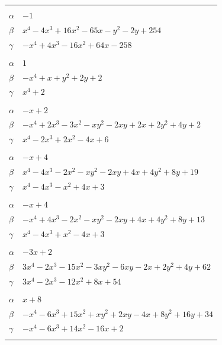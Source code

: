 \documentclass[11pt]{article}
\begin{document}
\begin{longtable}{@{}ll@{}}
\addlinespace[3pt]
\multicolumn{2}{@{}l}{$\{i,j\}=\{9,14\}$, $k_{ij}=2^{2}\cdot 3\cdot 5\cdot 17$}\\
$\alpha$ & $-1$\\
$\beta$ & $x^{4}-4x^{3}+16x^{2}-65x-y^{2}-2y+254$\\
$\gamma$ & $-x^{4}+4x^{3}-16x^{2}+64x-258$\\
\addlinespace[3pt]
\multicolumn{2}{@{}l}{$\{i,j\}=\{9,15\}$, $k_{ij}=2^{2}\cdot 3$}\\
$\alpha$ & $1$\\
$\beta$ & $-x^{4}+x+y^{2}+2y+2$\\
$\gamma$ & $x^{4}+2$\\
\addlinespace[3pt]
\multicolumn{2}{@{}l}{$\{i,j\}=\{9,17\}$, $k_{ij}=2^{2}\cdot 3$}\\
$\alpha$ & $-x+2$\\
$\beta$ & $-x^{4}+2x^{3}-3x^{2}-xy^{2}-2xy+2x+2y^{2}+4y+2$\\
$\gamma$ & $x^{4}-2x^{3}+2x^{2}-4x+6$\\
\addlinespace[3pt]
\multicolumn{2}{@{}l}{$\{i,j\}=\{9,19\}$, $k_{ij}=3\cdot 17$}\\
$\alpha$ & $-x+4$\\
$\beta$ & $x^{4}-4x^{3}-2x^{2}-xy^{2}-2xy+4x+4y^{2}+8y+19$\\
$\gamma$ & $x^{4}-4x^{3}-x^{2}+4x+3$\\
\addlinespace[3pt]
\multicolumn{2}{@{}l}{$\{i,j\}=\{9,24\}$, $k_{ij}=3^{2}\cdot 5$}\\
$\alpha$ & $-x+4$\\
$\beta$ & $-x^{4}+4x^{3}-2x^{2}-xy^{2}-2xy+4x+4y^{2}+8y+13$\\
$\gamma$ & $x^{4}-4x^{3}+x^{2}-4x+3$\\
\addlinespace[3pt]
\multicolumn{2}{@{}l}{$\{i,j\}=\{9,28\}$, $k_{ij}=2^{4}\cdot 3\cdot 5$}\\
$\alpha$ & $-3x+2$\\
$\beta$ & $3x^{4}-2x^{3}-15x^{2}-3xy^{2}-6xy-2x+2y^{2}+4y+62$\\
$\gamma$ & $3x^{4}-2x^{3}-12x^{2}+8x+54$\\
\addlinespace[3pt]
\multicolumn{2}{@{}l}{$\{i,j\}=\{9,31\}$, $k_{ij}=2^{2}\cdot 5^{2}$}\\
$\alpha$ & $x+8$\\
$\beta$ & $-x^{4}-6x^{3}+15x^{2}+xy^{2}+2xy-4x+8y^{2}+16y+34$\\
$\gamma$ & $-x^{4}-6x^{3}+14x^{2}-16x+2$\\
\addlinespace[3pt]
\multicolumn{2}{@{}l}{$\{i,j\}=\{10,17\}$, $k_{ij}=3\cdot 7$}\\

\end{longtable}
\end{document}
